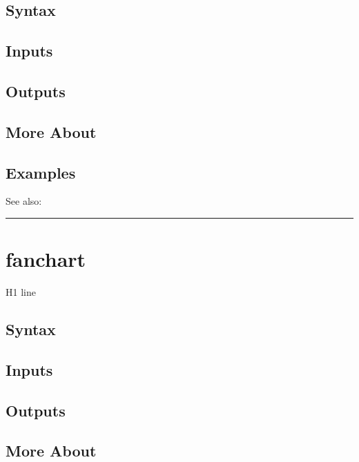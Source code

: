 \documentclass[letterpaper,10pt,english]{sphinxmanual}
\begin{document}
\subsection{Syntax}
\label{classes/time_series/@ts/ts:id222}

\subsection{Inputs}
\label{classes/time_series/@ts/ts:id223}

\subsection{Outputs}
\label{classes/time_series/@ts/ts:id224}

\subsection{More About}
\label{classes/time_series/@ts/ts:id225}

\subsection{Examples}
\label{classes/time_series/@ts/ts:id226}
See also:


\bigskip\hrule{}\bigskip



\section{fanchart}
\label{classes/time_series/@ts/ts:fanchart}\label{classes/time_series/@ts/ts:id227}
H1 line


\subsection{Syntax}
\label{classes/time_series/@ts/ts:id228}

\subsection{Inputs}
\label{classes/time_series/@ts/ts:id229}

\subsection{Outputs}
\label{classes/time_series/@ts/ts:id230}

\subsection{More About}
\label{classes/time_series/@ts/ts:id231}
\end{document}
